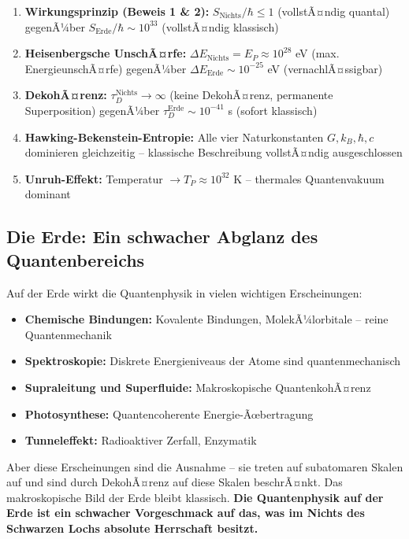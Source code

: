 ﻿\documentclass[12pt,a4paper]{report}
\begin{document}
\begin{enumerate}
    \item \textbf{Wirkungsprinzip (Beweis 1 \& 2):} $S_{\text{Nichts}}/\hbar \leq 1$ (vollstÃ¤ndig quantal) gegenÃ¼ber $S_{\text{Erde}}/\hbar \sim 10^{33}$ (vollstÃ¤ndig klassisch)
    \item \textbf{Heisenbergsche UnschÃ¤rfe:} $\Delta E_{\text{Nichts}} = E_P \approx 10^{28}$ eV (max. Energie\-unschÃ¤rfe) gegenÃ¼ber $\Delta E_{\text{Erde}} \sim 10^{-25}$ eV (vernachlÃ¤ssigbar)
    \item \textbf{DekohÃ¤renz:} $\tau_D^{\text{Nichts}} \to \infty$ (keine DekohÃ¤renz, permanente Superposition) gegenÃ¼ber $\tau_D^{\text{Erde}} \sim 10^{-41}$ s (sofort klassisch)
    \item \textbf{Hawking-Bekenstein-Entropie:} Alle vier Naturkonstanten $G, k_B, \hbar, c$ dominieren gleichzeitig -- klassische Beschreibung vollstÃ¤ndig ausgeschlossen
    \item \textbf{Unruh-Effekt:} Temperatur $\to T_P \approx 10^{32}$ K -- thermales Quantenvakuum dominant
\end{enumerate}

\subsection{Die Erde: Ein schwacher Abglanz des Quantenbereichs}

Auf der Erde wirkt die Quantenphysik in vielen wichtigen Erscheinungen:
\begin{itemize}
    \item \textbf{Chemische Bindungen:} Kovalente Bindungen, MolekÃ¼lorbitale -- reine Quantenmechanik
    \item \textbf{Spektroskopie:} Diskrete Energieniveaus der Atome sind quantenmechanisch
    \item \textbf{Supraleitung und Superfluide:} Makroskopische QuantenkohÃ¤renz
    \item \textbf{Photosynthese:} Quantencoherente Energie-Ãœbertragung
    \item \textbf{Tunneleffekt:} Radioaktiver Zerfall, Enzymatik
\end{itemize}
Aber diese Erscheinungen sind die Ausnahme -- sie treten auf subatomaren Skalen auf und sind durch DekohÃ¤renz auf diese Skalen beschrÃ¤nkt. Das makroskopische Bild der Erde bleibt klassisch. \textbf{Die Quantenphysik auf der Erde ist ein schwacher Vorgeschmack auf das, was im Nichts des Schwarzen Lochs absolute Herrschaft besitzt.}
\end{document}

